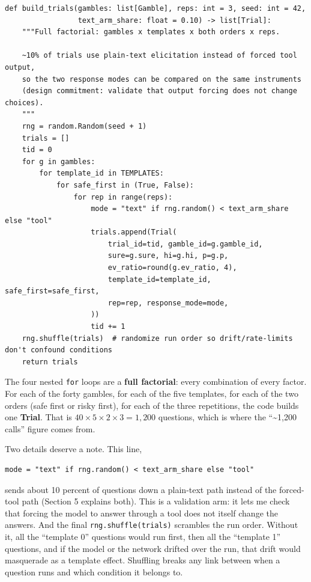 \documentclass[11pt]{article}
\newcommand{\term}[1]{\textbf{\color{mossdk}#1}}
\newcommand{\file}[1]{\textbf{\ttfamily #1}}
\begin{document}
\begin{lstlisting}[style=py,firstnumber=145]
def build_trials(gambles: list[Gamble], reps: int = 3, seed: int = 42,
                 text_arm_share: float = 0.10) -> list[Trial]:
    """Full factorial: gambles x templates x both orders x reps.

    ~10% of trials use plain-text elicitation instead of forced tool output,
    so the two response modes can be compared on the same instruments
    (design commitment: validate that output forcing does not change choices).
    """
    rng = random.Random(seed + 1)
    trials = []
    tid = 0
    for g in gambles:
        for template_id in TEMPLATES:
            for safe_first in (True, False):
                for rep in range(reps):
                    mode = "text" if rng.random() < text_arm_share else "tool"
                    trials.append(Trial(
                        trial_id=tid, gamble_id=g.gamble_id,
                        sure=g.sure, hi=g.hi, p=g.p,
                        ev_ratio=round(g.ev_ratio, 4),
                        template_id=template_id, safe_first=safe_first,
                        rep=rep, response_mode=mode,
                    ))
                    tid += 1
    rng.shuffle(trials)  # randomize run order so drift/rate-limits don't confound conditions
    return trials
\end{lstlisting}

The four nested \verb|for| loops are a \term{full factorial}: every combination of every factor. For
each of the forty gambles, for each of the five templates, for each of the two orders (safe first or
risky first), for each of the three repetitions, the code builds one \file{Trial}. That is
$40 \times 5 \times 2 \times 3 = 1{,}200$ questions, which is where the ``\textasciitilde 1{,}200
calls'' figure comes from.

Two details deserve a note. This line,

\begin{lstlisting}[style=sh]
mode = "text" if rng.random() < text_arm_share else "tool"
\end{lstlisting}

sends about 10 percent of questions down a plain-text path instead of the forced-tool path (Section 5
explains both). This is a validation arm: it lets me check that forcing the model to answer through a
tool does not itself change the answers. And the final \verb|rng.shuffle(trials)| scrambles the run
order. Without it, all the ``template 0'' questions would run first, then all the ``template 1''
questions, and if the model or the network drifted over the run, that drift would masquerade as a
template effect. Shuffling breaks any link between when a question runs and which condition it belongs
to.
\end{document}
